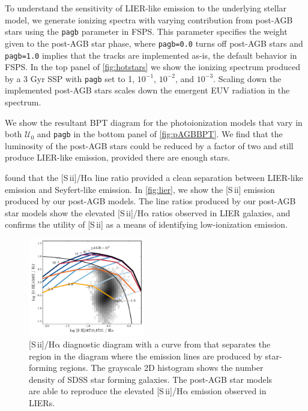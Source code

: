 \documentclass[twocolumn, tighten]{aastex61}
\newcommand{\Fig}[1]{\autoref{fig:#1}}
\newcommand{\FSPS}{{\sc FSPS}\xspace}
\newcommand{\sii}{[S\,{\sc ii}]\xspace}
\newcommand{\ha}{\ensuremath{\mathrm{H\alpha}}}
\newcommand{\U}{\ensuremath{\mathcal{U}_{0}}}
\begin{document}
To understand the sensitivity of LIER-like emission to the underlying stellar model, we generate ionizing spectra with varying contribution from post-AGB stars using the {\tt pagb} parameter in \FSPS. This parameter specifies the weight given to the post-AGB star phase, where {\tt pagb=0.0} turns off post-AGB stars and {\tt pagb=1.0} implies that the \citet{Vassiliadis} tracks are implemented as-is, the default behavior in \FSPS. In the top panel of \Fig{hotstars} we show the ionizing spectrum produced by a 3 Gyr SSP with {\tt pagb} set to 1, $10^{-1}$, $10^{-2}$, and $10^{-3}$. Scaling down the implemented post-AGB stars scales down the emergent EUV radiation in the spectrum.

We show the resultant BPT diagram for the photoionization models that vary in both \U{} and {\tt pagb} in the bottom panel of \Fig{pAGBBPT}. We find that the luminosity of the post-AGB stars could be reduced by a factor of two and still produce LIER-like emission, provided there are enough stars.

\citet{Belfiore16} found that the \sii{}/\ha{} line ratio provided a clean separation between LIER-like emission and Seyfert-like emission. In \Fig{lier}, we show the \sii{} emission produced by our post-AGB models. The line ratios produced by our post-AGB star models show the elevated \sii{}/\ha{} ratios observed in LIER galaxies, and confirms the utility of \sii{} as a means of identifying low-ionization emission.

\begin{figure}
  \begin{centering}
    \includegraphics[width=0.45\textwidth]{f27.pdf}
    \caption{\sii{}/\ha{} diagnostic diagram with a curve from \citet{Kewley01} that separates the region in the diagram where the emission lines are produced by star-forming regions. The grayscale 2D histogram shows the number density of SDSS star forming galaxies. The post-AGB star models are able to reproduce the elevated \sii{}/\ha{} emission observed in LIERs.}
    \label{fig:lier}
  \end{centering}
\end{figure}
\end{document}
